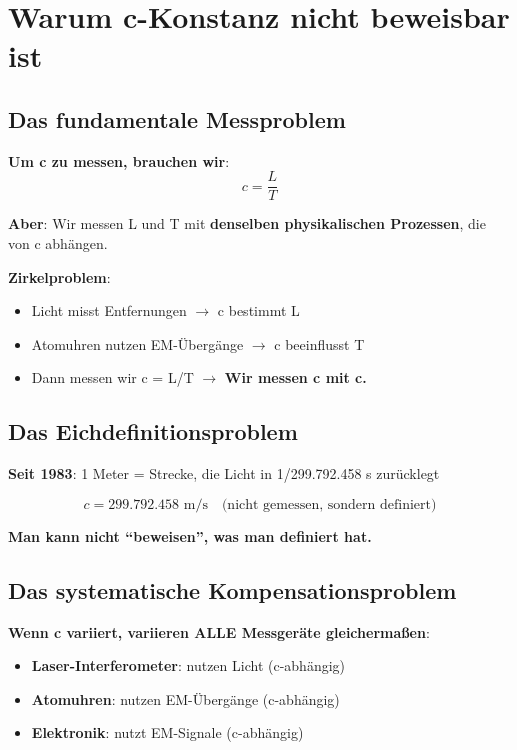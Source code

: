 	\section{Warum c-Konstanz nicht beweisbar ist}
	
	\subsection{Das fundamentale Messproblem}
	
	\textbf{Um c zu messen, brauchen wir}:
	\begin{equation}
		c = \frac{L}{T}
	\end{equation}
	
	\textbf{Aber}: Wir messen L und T mit \textbf{denselben physikalischen Prozessen}, die von c abhängen.
	
	\textbf{Zirkelproblem}:
	\begin{itemize}
		\item Licht misst Entfernungen $\rightarrow$ c bestimmt L
		\item Atomuhren nutzen EM-Übergänge $\rightarrow$ c beeinflusst T
		\item Dann messen wir c = L/T $\rightarrow$ \textbf{Wir messen c mit c.}
	\end{itemize}
	
	\subsection{Das Eichdefinitionsproblem}
	
	\textbf{Seit 1983}: 1 Meter = Strecke, die Licht in 1/299.792.458 s zurücklegt
	
	\begin{equation}
		c = 299.792.458 \text{ m/s} \quad \text{(nicht gemessen, sondern definiert)}
	\end{equation}
	
	\textbf{Man kann nicht ``beweisen'', was man definiert hat.}
	
	\subsection{Das systematische Kompensationsproblem}
	
	\textbf{Wenn c variiert, variieren ALLE Messgeräte gleichermaßen}:
	\begin{itemize}
		\item \textbf{Laser-Interferometer}: nutzen Licht (c-abhängig)
		\item \textbf{Atomuhren}: nutzen EM-Übergänge (c-abhängig)
		\item \textbf{Elektronik}: nutzt EM-Signale (c-abhängig)
	\end{itemize}
	
